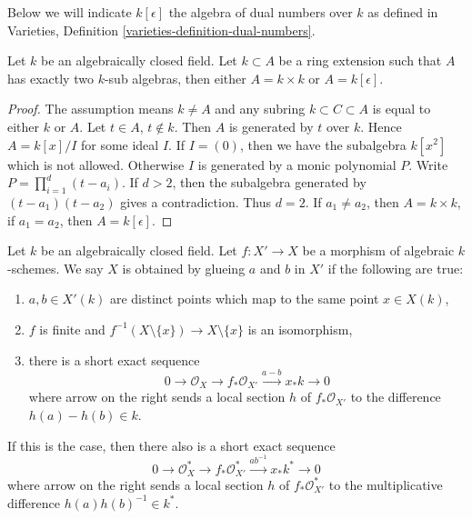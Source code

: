 \noindent
Below we will indicate $k[\epsilon]$ the algebra of dual numbers
over $k$ as defined in
Varieties, Definition \ref{varieties-definition-dual-numbers}.

\begin{lemma}
\label{lemma-no-in-between-over-k}
Let $k$ be an algebraically closed field. Let $k \subset A$ be a ring
extension such that $A$ has exactly two $k$-sub algebras, then
either $A = k \times k$ or $A = k[\epsilon]$.
\end{lemma}

\begin{proof}
The assumption means $k \not = A$ and any subring $k \subset C \subset A$
is equal to either $k$ or $A$. Let $t \in A$, $t \not \in k$.
Then $A$ is generated by $t$ over $k$. Hence $A = k[x]/I$ for some
ideal $I$. If $I = (0)$, then we have the subalgebra $k[x^2]$
which is not allowed. Otherwise $I$ is generated by a monic polynomial $P$.
Write $P = \prod_{i = 1}^d (t - a_i)$. If $d > 2$, then the subalgebra
generated by $(t - a_1)(t - a_2)$ gives a contradiction.
Thus $d = 2$. If $a_1 \not = a_2$, then $A = k \times k$,
if $a_1 = a_2$, then $A = k[\epsilon]$.
\end{proof}

\begin{example}
\label{example-glue-points}
Let $k$ be an algebraically closed field. Let $f : X' \to X$
be a morphism of algebraic $k$-schemes. We say $X$ is
obtained by glueing $a$ and $b$ in $X'$ if the following are true:
\begin{enumerate}
\item $a, b \in X'(k)$ are distinct points which map to the same
point $x \in X(k)$,
\item $f$ is finite and
$f^{-1}(X \setminus \{x\}) \to X \setminus \{x\}$ is an isomorphism,
\item there is a short exact sequence
$$
0 \to \mathcal{O}_X \to f_*\mathcal{O}_{X'} \xrightarrow{a - b} x_*k \to 0
$$
where arrow on the right sends a local section $h$ of $f_*\mathcal{O}_{X'}$
to the difference $h(a) - h(b) \in k$.
\end{enumerate}
If this is the case, then there also is a short exact sequence
$$
0 \to \mathcal{O}_X^* \to f_*\mathcal{O}_{X'}^*
\xrightarrow{ab^{-1}} x_*k^* \to 0
$$
where arrow on the right sends a local section $h$ of $f_*\mathcal{O}_{X'}^*$
to the multiplicative difference $h(a)h(b)^{-1} \in k^*$.
\end{example}

